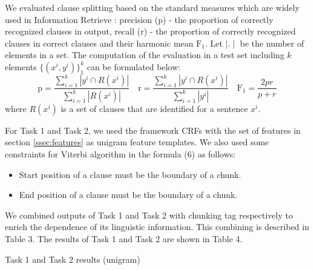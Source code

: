 \documentclass[english]{jnlp_1.4}
\begin{document}
{\begin{table}[b]

\vspace{-1\baselineskip}
\end{table}

We evaluated clause splitting based on the standard measures which
are widely used in Information Retrieve \cite{Rijsbergen1986}:
precision (p) - the proportion of correctly recognized clauses in
output, recall (r) - the proportion of correctly recognized
clauses in correct clauses and their harmonic mean $\mathrm{F}_1$.
Let $\mid . \mid$ be the number of elements in a set. The
computation of the evaluation in a test set including $k$ elements
\pagebreak
$\{(x^i,y^i)\}_1^k$ can be formulated below:
\[
  \mathrm {p} = \frac {\sum_{i=1}^k |y^i\cap
  R(x^i)|}{\sum_{i=1}^k|R(x^i)|} \quad \mathrm {r} = \frac {\sum_{i=1}^k |y^i\cap
  R(x^i)|}{\sum_{i=1}^k|y^i|}
  \quad \mathrm {F_1} =  \frac {2pr}{p + r}
\]
where $R(x^i)$ is a set of clauses that are identified for
a sentence $x^i$.

For Task 1 and Task 2, we used the framework CRFs with the set of
features in section \ref{ssec:features} as unigram feature
templates. We also used some constraints for Viterbi algorithm in
the formula (6) as follows:
\begin{itemize}
\item Start position of a clause must be the boundary of a chunk.
\item End position of a clause must be the boundary of a chunk.
\end{itemize}
We combined outputs of Task 1 and Task 2 with chunking tag
respectively to enrich the dependence of its linguistic
information. This combining is described in Table 3. The results
of Task 1 and Task 2 are shown in Table 4.

\begin{table}[b]

\end{table}
\begin{table}[b]
\caption{Task 1 and Task 2 results (unigram)}

\end{table}

}
\end{document}
